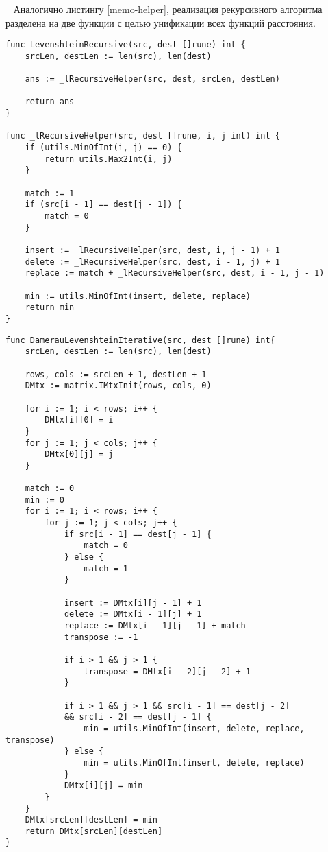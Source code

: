 ~\newline
Аналогично листингу \ref{memo-helper}, реализация рекурсивного алгоритма разделена на две функции с целью унификации всех функций расстояния.
~\newline
\begin{lstlisting}[label=leven-recursive,caption=Программный код нахождения расстояния Левенштейна с рекурсией]
func LevenshteinRecursive(src, dest []rune) int {
	srcLen, destLen := len(src), len(dest)
	
	ans := _lRecursiveHelper(src, dest, srcLen, destLen)
	
	return ans
}

func _lRecursiveHelper(src, dest []rune, i, j int) int {
	if (utils.MinOfInt(i, j) == 0) {
		return utils.Max2Int(i, j)
	}
	
	match := 1
	if (src[i - 1] == dest[j - 1]) {
		match = 0
	}
	
	insert := _lRecursiveHelper(src, dest, i, j - 1) + 1
	delete := _lRecursiveHelper(src, dest, i - 1, j) + 1
	replace := match + _lRecursiveHelper(src, dest, i - 1, j - 1)
	
	min := utils.MinOfInt(insert, delete, replace)
	return min
}
\end{lstlisting}

\begin{lstlisting}[label=damer-lev-iter,caption=Программный код нахождения расстояния Дамерау -- Левенштейна итеративно]
func DamerauLevenshteinIterative(src, dest []rune) int{
	srcLen, destLen := len(src), len(dest)
	
	rows, cols := srcLen + 1, destLen + 1
	DMtx := matrix.IMtxInit(rows, cols, 0)
	
	for i := 1; i < rows; i++ {
		DMtx[i][0] = i
	}
	for j := 1; j < cols; j++ {
		DMtx[0][j] = j
	}
	
	match := 0
	min := 0
	for i := 1; i < rows; i++ {
		for j := 1; j < cols; j++ {
			if src[i - 1] == dest[j - 1] {
				match = 0
			} else {
				match = 1
			}
			
			insert := DMtx[i][j - 1] + 1
			delete := DMtx[i - 1][j] + 1
			replace := DMtx[i - 1][j - 1] + match
			transpose := -1
			
			if i > 1 && j > 1 {
				transpose = DMtx[i - 2][j - 2] + 1
			}
			
			if i > 1 && j > 1 && src[i - 1] == dest[j - 2] 
			&& src[i - 2] == dest[j - 1] {
				min = utils.MinOfInt(insert, delete, replace, transpose)
			} else {
				min = utils.MinOfInt(insert, delete, replace)
			}
			DMtx[i][j] = min
		}
	}
	DMtx[srcLen][destLen] = min
	return DMtx[srcLen][destLen]
}	
\end{lstlisting}

